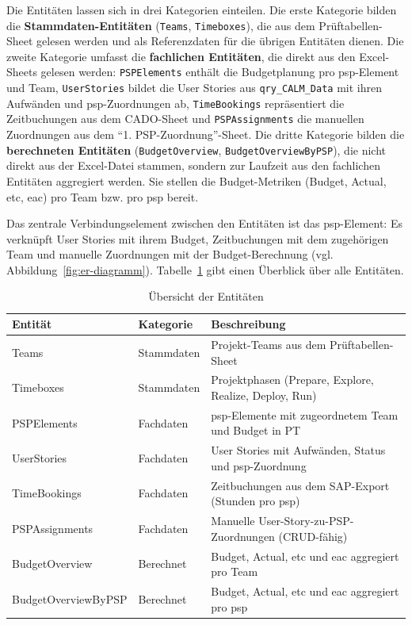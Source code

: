 Die Entitäten lassen sich in drei Kategorien einteilen. Die erste Kategorie bilden die \textbf{Stammdaten-Entitäten} (\texttt{Teams}, \texttt{Timeboxes}), die aus dem Prüftabellen-Sheet gelesen werden und als Referenzdaten für die übrigen Entitäten dienen. Die zweite Kategorie umfasst die \textbf{fachlichen Entitäten}, die direkt aus den Excel-Sheets gelesen werden: \texttt{PSPElements} enthält die Budgetplanung pro \gls{psp}-Element und Team, \texttt{UserStories} bildet die User Stories aus \texttt{qry\_CALM\_Data} mit ihren Aufwänden und \gls{psp}-Zuordnungen ab, \texttt{TimeBookings} repräsentiert die Zeitbuchungen aus dem CADO-Sheet und \texttt{PSPAssignments} die manuellen Zuordnungen aus dem \enquote{1. PSP-Zuordnung}-Sheet. Die dritte Kategorie bilden die \textbf{berechneten Entitäten} (\texttt{BudgetOverview}, \texttt{BudgetOverviewByPSP}), die nicht direkt aus der Excel-Datei stammen, sondern zur Laufzeit aus den fachlichen Entitäten aggregiert werden. Sie stellen die Budget-Metriken (Budget, Actual, \gls{etc}, \gls{eac}) pro Team bzw. pro \gls{psp} bereit.

Das zentrale Verbindungselement zwischen den Entitäten ist das \gls{psp}-Element: Es verknüpft User Stories mit ihrem Budget, Zeitbuchungen mit dem zugehörigen Team und manuelle Zuordnungen mit der Budget-Berechnung (vgl. Abbildung~\ref{fig:er-diagramm}). Tabelle~\ref{tab:entities} gibt einen Überblick über alle Entitäten.

\begin{table}[H]
\centering
\caption{Übersicht der Entitäten}
\label{tab:entities}
\begin{tabularx}{\textwidth}{ll>{\raggedright\arraybackslash}X}
\toprule
\textbf{Entität} & \textbf{Kategorie} & \textbf{Beschreibung} \\
\midrule
Teams & Stammdaten & 23 Projekt-Teams aus dem Prüftabellen-Sheet \\
Timeboxes & Stammdaten & Projektphasen (Prepare, Explore, Realize, Deploy, Run) \\
PSPElements & Fachdaten & \gls{psp}-Elemente mit zugeordnetem Team und Budget in PT \\
UserStories & Fachdaten & User Stories mit Aufwänden, Status und \gls{psp}-Zuordnung \\
TimeBookings & Fachdaten & Zeitbuchungen aus dem SAP-Export (Stunden pro \gls{psp}) \\
PSPAssignments & Fachdaten & Manuelle User-Story-zu-PSP-Zuordnungen (CRUD-fähig) \\
BudgetOverview & Berechnet & Budget, Actual, \gls{etc} und \gls{eac} aggregiert pro Team \\
BudgetOverviewByPSP & Berechnet & Budget, Actual, \gls{etc} und \gls{eac} aggregiert pro \gls{psp} \\
\bottomrule
\end{tabularx}
\end{table}

